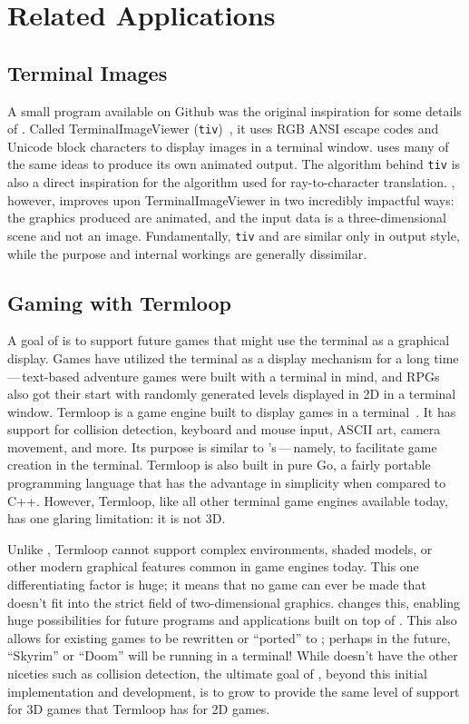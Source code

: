 \section{Related Applications}
\label{ch:relatedwork:applications}

\subsection{Terminal Images}
\label{ch:relatedwork:applications:tiv}

A small program available on Github was the original inspiration for some details of \name{}.
Called TerminalImageViewer (\texttt{tiv})~\cite{tivGithub}, it uses RGB ANSI escape codes and Unicode block characters to display images in a terminal window.
 \name{} uses many of the same ideas to produce its own animated output.
The algorithm behind \texttt{tiv} is also a direct inspiration for the algorithm used for ray-to-character translation.
 \name{}, however, improves upon TerminalImageViewer in two incredibly impactful ways: the graphics produced are animated, and the input data is a three-dimensional scene and not an image.
Fundamentally, \texttt{tiv} and \name{} are similar only in output style, while the purpose and internal workings are generally dissimilar.

\subsection{Gaming with Termloop}
\label{ch:relatedwork:applications:termloop}

A goal of \name{} is to support future games that might use the terminal as a graphical display.
Games have utilized the terminal as a display mechanism for a long time\,---\,text-based adventure games were built with a terminal in mind, and RPGs also got their start with randomly generated levels displayed in 2D in a terminal window.
Termloop is a game engine built to display games in a terminal~\cite{termloop}.
It has support for collision detection, keyboard and mouse input, ASCII art, camera movement, and more.
Its purpose is similar to \name{}'s\,---\,namely, to facilitate game creation in the terminal.
Termloop is also built in pure Go, a fairly portable programming language that has the advantage in simplicity when compared to C++.
However, Termloop, like all other terminal game engines available today, has one glaring limitation: it is not 3D.

Unlike \name{}, Termloop cannot support complex environments, shaded models, or other modern graphical features common in game engines today.
This one differentiating factor is huge; it means that no game can ever be made that doesn't fit into the strict field of two-dimensional graphics.
 \name{} changes this, enabling huge possibilities for future programs and applications built on top of \name{}.
This also allows for existing games to be rewritten or ``ported'' to \name{}; perhaps in the future, ``Skyrim'' or ``Doom'' will be running in a terminal!
While \name{} doesn't have the other niceties such as collision detection, the ultimate goal of \name{}, beyond this initial implementation and development, is to grow to provide the same level of support for 3D games that Termloop has for 2D games.

